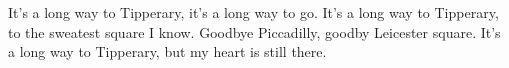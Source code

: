 \beginverse*
It’s a long way to Tipperary,
it’s a long way to go.
It’s a long way to Tipperary,
to the sweatest square I know.
Goodbye Piccadilly,
goodby Leicester square.
It’s a long way to Tipperary,
but my heart is still there.
\endverse
\endsong